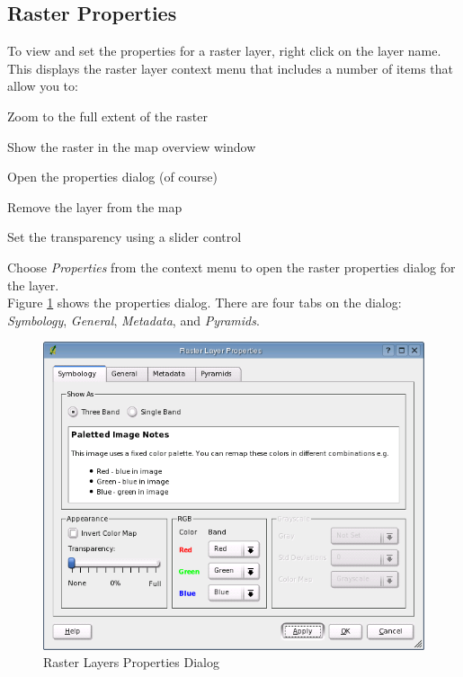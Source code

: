 \documentclass[10pt,english]{article}
\begin{document}
\begin{onehalfspace}
\subsection{Raster Properties}

To view and set the properties for a raster layer, right click on the layer name. This displays the raster layer context menu that includes a number of items that allow you to:
\begin{compactitem}
\item Zoom to the full extent of the raster
\item Show the raster in the map overview window
\item Open the properties dialog (of course)
\item Remove the layer from the map
\item Set the transparency using a slider control
\end{compactitem}
Choose \textsl{Properties} from the context menu to open the raster properties dialog for the layer.\\


Figure \ref{fig:raster_properties} shows the properties dialog. There are four tabs on the dialog: \textsl{Symbology}, \textsl{General}, \textsl{Metadata}, and \textsl{Pyramids}.

\begin{figure}[h]
   \begin{center}
   \caption{Raster Layers Properties Dialog}\label{fig:raster_properties}\smallskip
   \includegraphics[scale=.7]{qgis_user_guide_images/raster_properties}
\end{center}  
\end{figure}



\end{onehalfspace}
\end{document}
